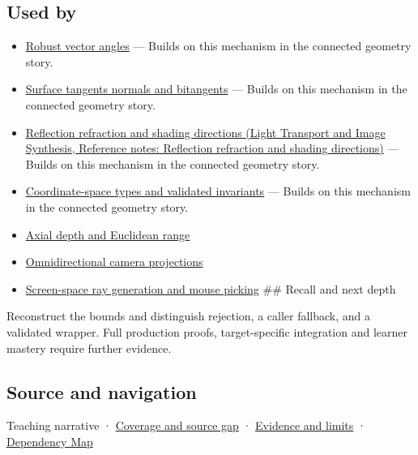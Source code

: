 \subsection{Used by}\label{appendix-f744e41b95b4-used-by}

\hypertarget{appendix-f744e41b95b4-used-by}{}

\begin{itemize}
\item
  \hyperref[appendix-e569e60e18e6]{Robust vector angles} --- Builds on this mechanism in the connected geometry story.
\item
  \hyperref[appendix-e31893dec985]{Surface tangents normals and bitangents} --- Builds on this mechanism in the connected geometry story.
\item
  \href{../04-Light-Transport-and-Image-Synthesis/main.pdf\#nameddest=appendix-44e00863b4d5}{Reflection refraction and shading directions (Light Transport and Image Synthesis, Reference notes: Reflection refraction and shading directions)} --- Builds on this mechanism in the connected geometry story.
\item
  \hyperref[appendix-380a220e2529]{Coordinate-space types and validated invariants} --- Builds on this mechanism in the connected geometry story.
\item
  \hyperref[appendix-cac01ebeeb11]{Axial depth and Euclidean range}
\item
  \hyperref[appendix-fc99ad39f351]{Omnidirectional camera projections}
\item
  \hyperref[appendix-f1a6d43e80d1]{Screen-space ray generation and mouse picking} \#\# Recall and next depth
\end{itemize}

Reconstruct the bounds and distinguish rejection, a caller fallback, and a validated wrapper. Full production proofs, target-specific integration and learner mastery require further evidence.

\subsection{Source and navigation}\label{appendix-f744e41b95b4-source-and-navigation}

\hypertarget{appendix-f744e41b95b4-source-and-navigation}{}

{Teaching narrative} · \hyperref[appendix-fd090d982a15-phase-6---parts-501-600]{Coverage and source gap} · \hyperref[appendix-a103e7846d21-phase-6---source-analysis-and-verification]{Evidence and limits} · \hyperref[appendix-4ad47bdd269a]{Dependency Map}
